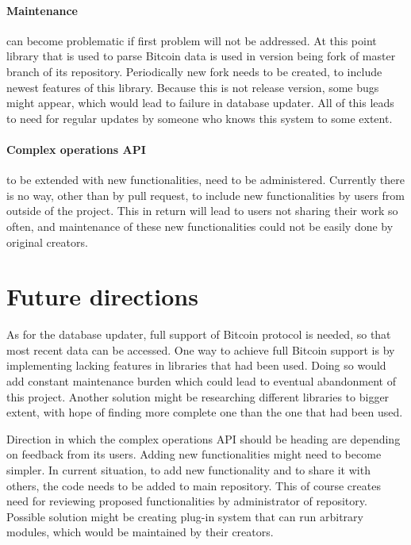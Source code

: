 \documentclass[12pt, en, eng, oneside]{mgr}
\begin{document}
\paragraph{Maintenance} can become problematic if first problem will not be addressed. At this point library that is used to parse Bitcoin data is used in version being fork of master branch of its repository. Periodically new fork needs to be created, to include newest features of this library. Because this is not release version, some bugs might appear, which would lead to failure in database updater. All of this leads to need for regular updates by someone who knows this system to some extent. 

\paragraph{Complex operations API} to be extended with new functionalities, need to be administered. Currently there is no way, other than by pull request, to include new functionalities by users from outside of the project. This in return will lead to users not sharing their work so often, and maintenance of these new functionalities could not be easily done by original creators.

\section{Future directions}
As for the database updater, full support of Bitcoin protocol is needed, so that most recent data can be accessed. One way to achieve full Bitcoin support is by implementing lacking features in libraries that had been used. Doing so would add constant maintenance burden which could lead to eventual abandonment of this project. Another solution might be researching different libraries to bigger extent, with hope of finding more complete one than the one that had been used.

Direction in which the complex operations API should be heading are depending on feedback from its users. Adding new functionalities might need to become simpler. In current situation, to add new functionality and to share it with others, the code needs to be added to main repository. This of course creates need for reviewing proposed functionalities by administrator of repository. Possible solution might be creating plug-in system that can run arbitrary modules, which would be maintained by their creators. 
\end{document}
